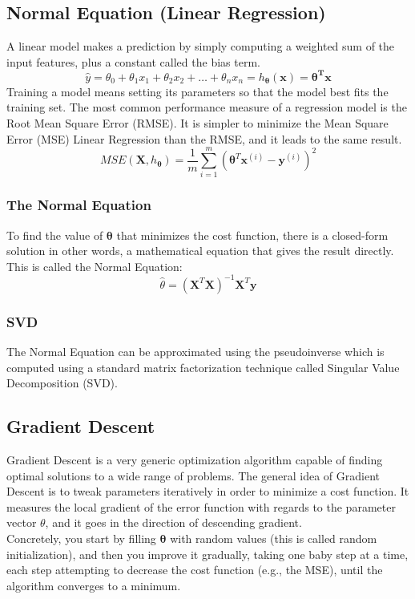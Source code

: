 \documentclass[french]{article}
\begin{document}
\subsection{Normal Equation (Linear Regression)}

A linear model makes a prediction by simply computing a weighted sum of the input features, plus a constant called the bias term.
\[\hat y = \theta_0 + \theta_1 x_1 + \theta_2 x_2 + \dots + \theta_n x_n = h_{\bm{\theta}}(\bm{x}) = \bm{\theta^T} \bm{x}\]
Training a model means setting its parameters so that the model best fits the training set. The most common performance measure of a regression model is the Root Mean Square Error (RMSE). It is simpler to minimize the Mean Square Error (MSE) Linear Regression than the RMSE, and it leads to the same result.
\[ MSE(\bm{X}, h_{\bm{\theta}}) = \frac{1}{m} \sum_{i=1}^m (\bm{\theta}^T\bm{x}^{(i)} - \bm{y}^{(i)}  )^2\]

\subsubsection{The Normal Equation}
To find the value of $\bm{\theta}$ that minimizes the cost function, there is a closed-form solution in other words, a mathematical equation that gives the result directly. This is called the Normal Equation:
\[\hat \theta = (\bm{X}^T \bm{X})^{-1}\bm{X}^T \bm{y}\]

\subsubsection{SVD}

The Normal Equation can be approximated using the pseudoinverse which is computed using a standard matrix factorization technique called Singular Value Decomposition (SVD).

\subsection{Gradient Descent}

Gradient Descent is a very generic optimization algorithm capable of finding optimal solutions to a wide range of problems. The general idea of Gradient Descent is to tweak parameters iteratively in order to minimize a cost function. It measures the local gradient of the error function with regards to the parameter vector $\theta$, and it goes in the direction of descending gradient.\\

Concretely, you start by filling $\bm{\theta}$ with random values (this is called random initialization), and then you improve it gradually, taking one baby step at a time, each step attempting to decrease the cost function (e.g., the MSE), until the algorithm converges to a minimum. \\
\end{document}
